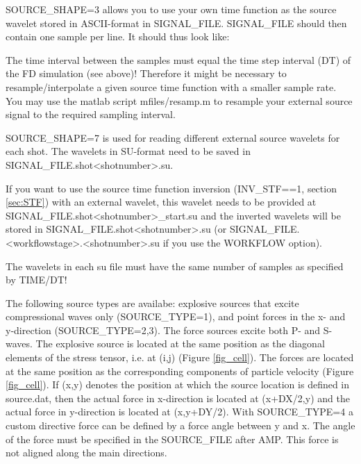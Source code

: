 \newpage

SOURCE\_SHAPE=3 allows you to use your own time function as the source wavelet stored in ASCII-format in SIGNAL\_FILE. SIGNAL\_FILE should then contain one sample per line. It should thus look like:

{\color{blue}{\begin{verbatim}
0.0
0.01
0.03
...
\end{verbatim}}}

The time interval between the samples must equal the time step interval (DT) of the FD simulation (see above)! Therefore it might be necessary to resample/interpolate a given source time function with a smaller sample rate. You may use the matlab script mfiles/resamp.m to resample your external source signal to the required sampling interval.
\newline

SOURCE\_SHAPE=7 is used for reading different external source wavelets for each shot. The wavelets in SU-format need to be saved in SIGNAL\_FILE.shot<shotnumber>.su.

If you want to use the source time function inversion (INV\_STF==1, section \ref{sec:STF}) with an external wavelet, this wavelet needs to be provided at SIGNAL\_FILE.shot<shotnumber>\_start.su and the inverted wavelets will be stored in SIGNAL\_FILE.shot<shotnumber>.su (or SIGNAL\_FILE.<workflowstage>.<shotnumber>.su if you use the WORKFLOW option).

The wavelets in each su file must have the same number of samples as specified by TIME/DT!
\newline

The following source types are availabe: explosive sources that excite compressional waves only (SOURCE\_TYPE=1), and point forces in the x- and y-direction (SOURCE\_TYPE=2,3).
The force sources excite both P- and S-waves. The explosive source is located at the same position as the diagonal elements of the stress tensor, i.e. at (i,j) (Figure \ref{fig_cell}).
The forces are located at the same position as the corresponding components of particle velocity (Figure \ref{fig_cell}). If (x,y) denotes the position at which the source location is defined in source.dat, then the actual force in x-direction is located at (x+DX/2,y) and the actual force in y-direction is located at (x,y+DY/2). With SOURCE\_TYPE=4 a custom directive force can be defined by a force angle between y and x. The angle of the force must be specified in the SOURCE\_FILE after AMP. This force is not aligned along the main directions.
\newline

